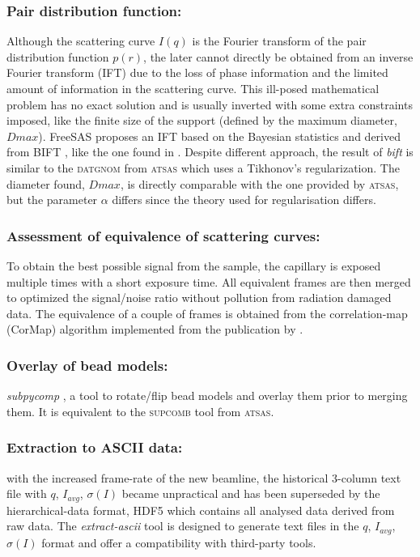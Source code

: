 \documentclass[preprint]{iucr}              %
\begin{document}
\subsubsection{Pair distribution function:}
Although the scattering curve $I(q)$ is the Fourier transform of the pair distribution function $p(r)$, the later cannot directly be obtained from an inverse Fourier transform (IFT) due to the loss of phase information and the limited amount of information in the scattering curve. 
This ill-posed mathematical problem has no exact solution and is usually inverted with some extra constraints imposed, like the finite size of the support (defined by the maximum diameter, $Dmax$).    
FreeSAS proposes an IFT based on the Bayesian statistics and derived from BIFT \cite{bift}, like the one found in .
Despite different approach, the result of \textit{bift} is similar to the \textsc{datgnom} \cite{ATSAS1} from \textsc{atsas} which uses a Tikhonov's regularization.
The diameter found, $Dmax$, is directly comparable with the one provided by \textsc{atsas}, but the parameter $\alpha$ differs since the theory used for regularisation differs. 

\subsubsection{Assessment of equivalence of scattering curves: }
To obtain the best possible signal from the sample, the capillary is exposed multiple times with a short exposure time.
All equivalent frames are then merged to optimized the signal/noise ratio without pollution from radiation damaged data.  
The equivalence of a couple of frames is obtained from the correlation-map (CorMap) algorithm implemented from the publication by .

\subsubsection{Overlay of bead models:}
\textit{subpycomp} \cite{BM29ODA}, a tool to rotate/flip bead models and overlay them prior to merging them. It is equivalent to the \textsc{supcomb} \cite{supcomb} tool from \textsc{atsas}. 

\subsubsection{Extraction to ASCII data:} with the increased frame-rate of the new beamline, the historical 3-column text file with $q$, $I_{avg}$, $\sigma(I)$ became unpractical and has been superseded by the hierarchical-data format, HDF5 \cite{hdf5} which contains all analysed data derived from raw data.
The \textit{extract-ascii} tool is designed to generate text files in the  $q$, $I_{avg}$, $\sigma(I)$ format and offer a compatibility with third-party tools.
\end{document}
